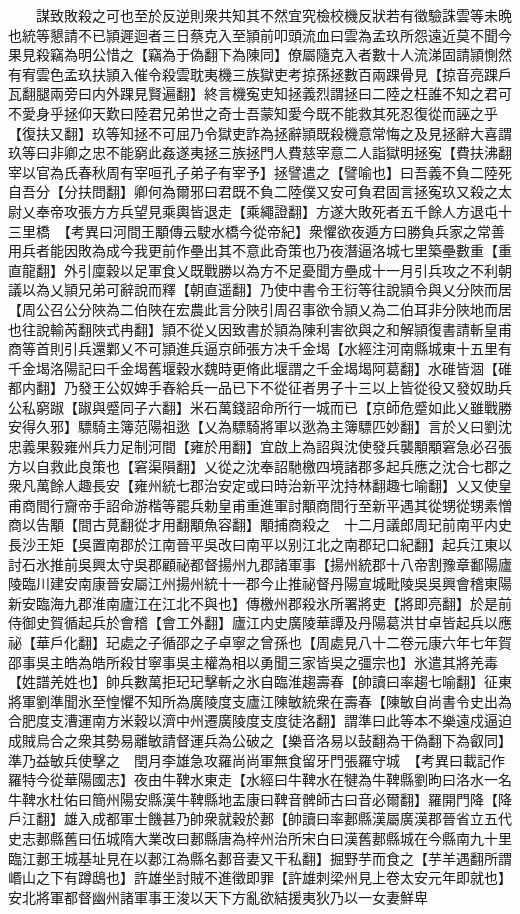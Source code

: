 　　謀致敗殺之可也至於反逆則衆共知其不然宜究檢校機反狀若有徵驗誅雲等未晩也統等懇請不已頴遲迴者三日蔡克入至頴前叩頭流血曰雲為孟玖所怨遠近莫不聞今果見殺竊為明公惜之【竊為于偽翻下為陳同】僚屬隨克入者數十人流涕固請頴惻然有宥雲色孟玖扶頴入催令殺雲耽夷機三族獄吏考掠孫拯數百兩踝骨見【掠音亮踝戶瓦翻腿兩旁曰内外踝見賢遍翻】終言機寃吏知拯義烈謂拯曰二陸之枉誰不知之君可不愛身乎拯仰天歎曰陸君兄弟世之奇士吾蒙知愛今既不能救其死忍復從而誣之乎【復扶又翻】玖等知拯不可屈乃令獄吏詐為拯辭頴既殺機意常悔之及見拯辭大喜謂玖等曰非卿之忠不能窮此姦遂夷拯三族拯門人費慈宰意二人詣獄明拯寃【費扶沸翻宰以官為氏春秋周有宰咺孔子弟子有宰予】拯譬遣之【譬喻也】曰吾義不負二陸死自吾分【分扶問翻】卿何為爾邪曰君既不負二陸僕又安可負君固言拯寃玖又殺之太尉乂奉帝攻張方方兵望見乘輿皆退走【乘繩證翻】方遂大敗死者五千餘人方退屯十三里橋　【考異曰河間王顒傳云駛水橋今從帝紀】衆懼欲夜遁方曰勝負兵家之常善用兵者能因敗為成今我更前作壘出其不意此奇策也乃夜潛逼洛城七里築壘數重【重直龍翻】外引廩穀以足軍食乂既戰勝以為方不足憂聞方壘成十一月引兵攻之不利朝議以為乂頴兄弟可辭說而釋【朝直遥翻】乃使中書令王衍等往說頴令與乂分陜而居【周公召公分陜為二伯陜在宏農此言分陜引周召事欲令頴乂為二伯耳非分陜地而居也往說輸芮翻陜式冉翻】頴不從乂因致書於頴為陳利害欲與之和解頴復書請斬皇甫商等首則引兵還鄴乂不可頴進兵逼京師張方决千金堨【水經注河南縣城東十五里有千金堨洛陽記曰千金堨舊堰穀水魏時更脩此堰謂之千金堨堨阿葛翻】水碓皆涸【碓都内翻】乃發王公奴婢手舂給兵一品已下不從征者男子十三以上皆從役又發奴助兵公私窮踧【踧與蹙同子六翻】米石萬錢詔命所行一城而已【京師危蹙如此乂雖戰勝安得久邪】驃騎主簿范陽祖逖【乂為驃騎將軍以逖為主簿驃匹妙翻】言於乂曰劉沈忠義果毅雍州兵力足制河間【雍於用翻】宜啟上為詔與沈使發兵襲顒顒窘急必召張方以自救此良策也【窘渠隕翻】乂從之沈奉詔馳檄四境諸郡多起兵應之沈合七郡之衆凡萬餘人趣長安【雍州統七郡治安定或曰時治新平沈持林翻趣七喻翻】乂又使皇甫商間行齎帝手詔命游楷等罷兵勅皇甫重進軍討顒商間行至新平遇其從甥從甥素憎商以告顒【間古莧翻從才用翻顒魚容翻】顒捕商殺之　十二月議郎周玘前南平内史長沙王矩【吳置南郡於江南晉平吳改曰南平以别江北之南郡玘口紀翻】起兵江東以討石氷推前吳興太守吳郡顧祕都督揚州九郡諸軍事【揚州統郡十八帝割豫章鄱陽廬陵臨川建安南康晉安屬江州揚州統十一郡今止推祕督丹陽宣城毗陵吳吳興會稽東陽新安臨海九郡淮南廬江在江北不與也】傳檄州郡殺氷所署將吏【將即亮翻】於是前侍御史賀循起兵於會稽【會工外翻】廬江内史廣陵華譚及丹陽葛洪甘卓皆起兵以應祕【華戶化翻】玘處之子循邵之子卓寧之曾孫也【周處見八十二卷元康六年七年賀邵事吳主皓為皓所殺甘寧事吳主權為相以勇聞三家皆吳之彊宗也】氷遣其將羌毒【姓譜羌姓也】帥兵數萬拒玘玘擊斬之氷自臨淮趨壽春【帥讀曰率趨七喻翻】征東將軍劉準聞氷至惶懼不知所為廣陵度支廬江陳敏統衆在壽春【陳敏自尚書令史出為合肥度支漕運南方米穀以濟中州遷廣陵度支度徒洛翻】謂準曰此等本不樂遠戍逼迫成賊烏合之衆其勢易離敏請督運兵為公破之【樂音洛易以鼔翻為干偽翻下為叡同】準乃益敏兵使擊之　閏月李雄急攻羅尚尚軍無食留牙門張羅守城　【考異曰載記作羅特今從華陽國志】夜由牛鞞水東走【水經曰牛鞞水在犍為牛鞞縣劉昫曰洛水一名牛鞞水杜佑曰簡州陽安縣漢牛鞞縣地盂康曰鞞音髀師古曰音必爾翻】羅開門降【降戶江翻】雄入成都軍士饑甚乃帥衆就穀於郪【帥讀曰率郪縣漢屬廣漢郡晉省立五代史志郪縣舊曰伍城隋大業改曰郪縣唐為梓州治所宋白曰漢舊郪縣城在今縣南九十里臨江郪王城基址見在以郪江為縣名郪音妻又干私翻】掘野芋而食之【芋羊遇翻所謂㟭山之下有蹲鴟也】許雄坐討賊不進徵即罪【許雄刺梁州見上卷太安元年即就也】　安北將軍都督幽州諸軍事王浚以天下方亂欲結援夷狄乃以一女妻鮮卑